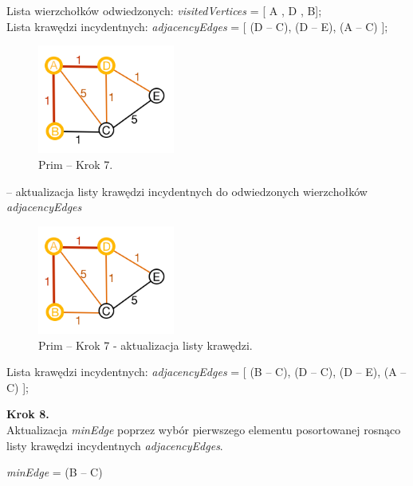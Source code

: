 \begin{center}
	Lista wierzchołków odwiedzonych: \emph{visitedVertices} = [ A , D , B];\\
	Lista krawędzi incydentnych: \emph{adjacencyEdges} = [ (D -- C), (D -- E), (A -- C) ];\\
\end{center}
\begin{figure}[htb!]
	\centering
	\includegraphics[width=0.4\textwidth]{tex/fig/graf6}
	\caption{Prim -- Krok 7.}
	\label{fig: g6}
\end{figure}
-- aktualizacja listy krawędzi incydentnych do odwiedzonych wierzchołków \emph{adjacencyEdges}
\begin{figure}[htb!]
	\centering
	\includegraphics[width=0.4\textwidth]{tex/fig/graf7}
	\caption{Prim -- Krok 7 - aktualizacja listy krawędzi.}
	\label{fig: g7}
\end{figure}
\begin{center}
	Lista krawędzi incydentnych: \emph{adjacencyEdges} = [ (B -- C), (D -- C), (D -- E), (A -- C) ];\\
\end{center}

\textbf{Krok 8.}\\
Aktualizacja \emph{minEdge} poprzez wybór pierwszego elementu posortowanej rosnąco listy krawędzi incydentnych \emph{adjacencyEdges}.\\
\begin{center}
	\emph{minEdge} = (B -- C)
\end{center}

